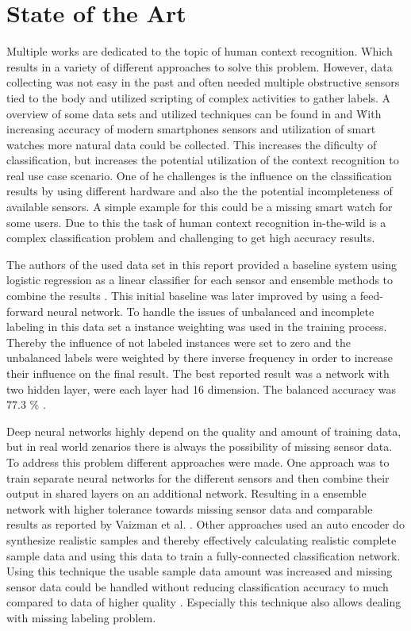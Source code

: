 \section{State of the Art}
Multiple works are dedicated to the topic of human context recognition. Which results in a variety of different approaches to solve this problem. However, data collecting was not easy in the past and often needed multiple obstructive sensors tied to the body and utilized scripting of complex activities to gather labels. A overview of some data sets and utilized techniques can be found in \cite{Ramasamy18} and \cite{Lara13}\. With increasing accuracy of modern smartphones sensors and utilization of smart watches more natural data could be collected. This increases the dificulty of classification, but increases the potential utilization of the context recognition to real use case scenario. One of he challenges is the influence on the classification results by using different hardware \cite{Stisen15} and also the the potential incompleteness of available sensors. A simple example for this could be a missing smart watch for some users. Due to this the task of human context recognition in-the-wild is a complex classification problem and challenging to get high accuracy results. 
 
The authors of the used data set in this report provided a baseline system using logistic regression as a linear classifier for each sensor and ensemble methods to combine the results \cite{Vaizman17}. This initial baseline was later improved by using a feed-forward neural network. To handle the issues of unbalanced and incomplete labeling in this data set a instance weighting was used in the training process. Thereby the influence of not labeled instances were set to zero and the unbalanced labels were weighted by there inverse frequency in order to increase their influence on the final result. The best reported result was a network with two hidden layer, were each layer had 16 dimension. The balanced accuracy was 77.3 \% \cite{Vaizman18}. 

Deep neural networks highly depend on the quality and amount of training data, but in real world zenarios there is always the possibility of missing sensor data. To address this problem different approaches were made. One approach was to train separate neural networks for the different sensors and then combine their output in shared layers on an additional network. Resulting in a ensemble network with higher tolerance towards missing sensor data and comparable results as reported by Vaizman et al. \cite{Saeed18}. Other approaches used an auto encoder do synthesize realistic samples and thereby effectively calculating realistic complete sample data and using this data to train a fully-connected classification network. Using this technique the usable sample data amount was increased and missing sensor data could be handled without reducing classification accuracy to much compared to data of higher quality \cite{Saeed18-2}. Especially this technique also allows dealing with missing labeling problem.


